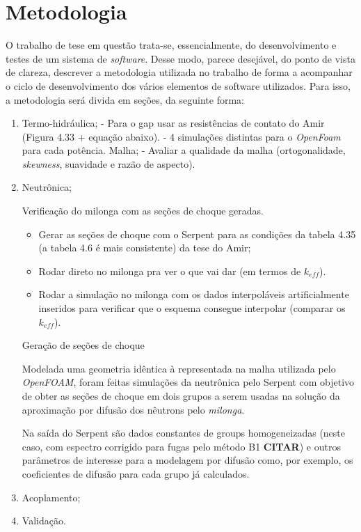 \chapter{Metodologia}
\label{chap:metodologia}

O trabalho de tese em questão trata-se, essencialmente, do desenvolvimento e testes
de um sistema de \textit{software}. Desse modo, parece desejável, do ponto de vista de
clareza, descrever a metodologia utilizada no trabalho de forma a acompanhar o ciclo
de desenvolvimento dos vários elementos de software utilizados. Para isso, a metodologia
será divida em seções, da seguinte forma:
\begin{enumerate}
\item Termo-hidráulica;
  - Para o gap usar as resistências de contato do Amir (Figura 4.33 + equação abaixo).
  - 4 simulações distintas para o \textit{OpenFoam} para cada potência.
  \subitem Malha;
  - Avaliar a qualidade da malha (ortogonalidade, \textit{skewness},
  suavidade e razão de aspecto).
\item Neutrônica;

  Verificação do milonga com as seções de choque geradas.
  
  \begin{itemize}
  \item Gerar as seções de choque com o Serpent para as condições da tabela 4.35 (a tabela 4.6 é mais consistente) da tese do Amir;
  \item Rodar direto no milonga pra ver o que vai dar (em termos de \textit{$k_{eff}$}).
  \item Rodar a simulação no milonga com os dados interpoláveis artificialmente inseridos para verificar que o esquema consegue interpolar (comparar os \textit{$k_{eff}$}).
  \end{itemize}

  \subitem Geração de seções de choque

  Modelada uma geometria idêntica à representada na malha utilizada pelo \textit{OpenFOAM},
  foram feitas simulações da neutrônica pelo Serpent com objetivo de obter as seções
  de choque em dois grupos a serem usadas na solução da aproximação por difusão dos nêutrons
  pelo \textit{milonga}.

  Na saída do Serpent são dados constantes de groups homogeneizadas (neste caso, com espectro
  corrigido para fugas pelo método B1 \textbf{CITAR}) e outros parâmetros de interesse para
  a modelagem por difusão como, por exemplo, os coeficientes de difusão para cada grupo já
  calculados.

  
\item Acoplamento;
\item Validação.
\end{enumerate}

